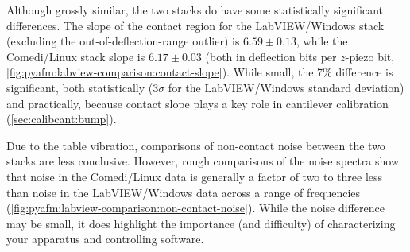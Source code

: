 Although grossly similar, the two stacks do have some statistically
significant differences.  The slope of the contact region for the
LabVIEW/Windows stack (excluding the out-of-deflection-range outlier)
is $6.59\pm0.13$, while the Comedi/Linux stack slope is $6.17\pm0.03$
(both in deflection bits per $z$-piezo bit,
\cref{fig:pyafm:labview-comparison:contact-slope}).  While small, the
7\% difference is significant, both statistically ($3\sigma$ for the
LabVIEW/Windows standard deviation) and practically, because contact
slope plays a key role in cantilever calibration
(\cref{sec:calibcant:bump}).

Due to the table vibration, comparisons of non-contact noise between
the two stacks are less conclusive.  However, rough comparisons of the
noise spectra show that noise in the Comedi/Linux data is generally a
factor of two to three less than noise in the LabVIEW/Windows data
across a range of frequencies
(\cref{fig:pyafm:labview-comparison:non-contact-noise}).  While the
noise difference may be small, it does highlight the importance (and
difficulty) of characterizing your apparatus and controlling software.
